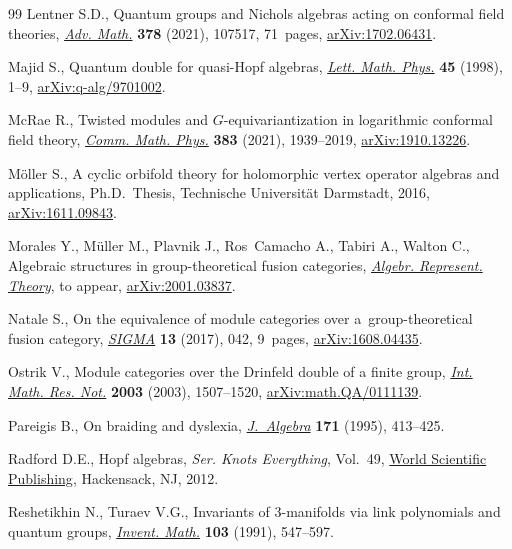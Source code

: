 \begin{thebibliography}{99}
Lentner S.D., Quantum groups and {N}ichols algebras acting on conformal field
 theories, \href{https://doi.org/10.1016/j.aim.2020.107517}{\textit{Adv. Math.}} \textbf{378} (2021), 107517, 71~pages,
 \href{https://arxiv.org/abs/1702.06431}{arXiv:1702.06431}.

Majid S., Quantum double for quasi-{H}opf algebras, \href{https://doi.org/10.1023/A:1007450123281}{\textit{Lett. Math. Phys.}}
 \textbf{45} (1998), 1--9, \href{https://arxiv.org/abs/q-alg/9701002}{arXiv:q-alg/9701002}.

McRae R., Twisted modules and {$G$}-equivariantization in logarithmic conformal
 field theory, \href{https://doi.org/10.1007/s00220-020-03882-2}{\textit{Comm. Math. Phys.}} \textbf{383} (2021), 1939--2019,
 \href{https://arxiv.org/abs/1910.13226}{arXiv:1910.13226}.

M\"oller S., A cyclic orbifold theory for holomorphic vertex operator algebras
 and applications, Ph.D.~Thesis, {T}echnische Universit{\"a}t Darmstadt, 2016,
 \href{https://arxiv.org/abs/1611.09843}{arXiv:1611.09843}.

Morales Y., M\"uller M., Plavnik J., Ros~Camacho A., Tabiri A., Walton C.,
 Algebraic structures in group-theoretical fusion categories, \href{https://doi.org/10.1007/s10468-022-10186-7}{\textit{Algebr.
 Represent. Theory}}, {t}o appear, \href{https://arxiv.org/abs/2001.03837}{arXiv:2001.03837}.

Natale S., On the equivalence of module categories over a~group-theoretical
 fusion category, \href{https://doi.org/10.3842/SIGMA.2017.042}{\textit{SIGMA}} \textbf{13} (2017), 042, 9~pages,
 \href{https://arxiv.org/abs/1608.04435}{arXiv:1608.04435}.

Ostrik V., Module categories over the {D}rinfeld double of a finite group,
 \href{https://doi.org/10.1155/S1073792803205079}{\textit{Int. Math. Res. Not.}} \textbf{2003} (2003), 1507--1520,
 \href{https://arxiv.org/abs/math.QA/0111139}{arXiv:math.QA/0111139}.

Pareigis B., On braiding and dyslexia, \href{https://doi.org/10.1006/jabr.1995.1019}{\textit{J.~Algebra}} \textbf{171} (1995),
 413--425.

Radford D.E., Hopf algebras, \textit{Ser. Knots Everything}, Vol.~49, \href{https://doi.org/10.1142/8055}{World
 Scientific Publishing}, Hackensack, NJ, 2012.

Reshetikhin N., Turaev V.G., Invariants of {$3$}-manifolds via link polynomials
 and quantum groups, \href{https://doi.org/10.1007/BF01239527}{\textit{Invent. Math.}} \textbf{103} (1991), 547--597.


\end{thebibliography}
